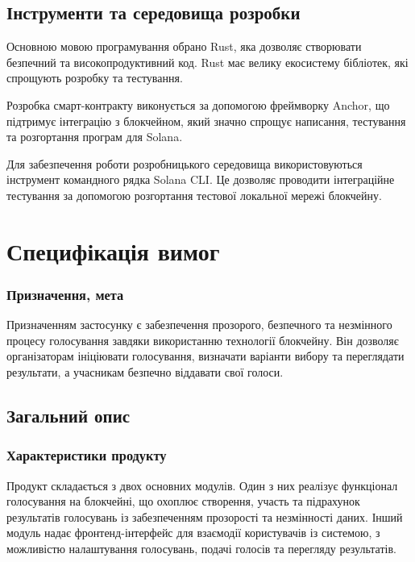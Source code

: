 \documentclass[14pt]{extreport}
\begin{document}
  \subsection{Інструменти та середовища розробки}
  
  
  Основною мовою програмування обрано Rust, яка дозволяє створювати безпечний та високопродуктивний код. Rust має велику екосистему бібліотек, які спрощують розробку та тестування.

  Розробка смарт-контракту виконується за допомогою фреймворку Anchor, що підтримує інтеграцію з блокчейном, який значно спрощує написання, тестування та розгортання програм для Solana.

  Для забезпечення роботи розробницького середовища використовуються інструмент командного рядка Solana CLI. Це дозволяє проводити інтеграційне тестування за допомогою розгортання тестової локальної мережі блокчейну.
  
  \section{Специфікація вимог}
  \subsubsection{Призначення, мета}
  
  Призначенням застосунку є забезпечення прозорого, безпечного та незмінного процесу голосування завдяки використанню технології блокчейну. Він дозволяє організаторам ініціювати голосування, визначати варіанти вибору та переглядати результати, а учасникам безпечно віддавати свої голоси.
  
  
  \subsection{Загальний опис}
  \subsubsection{Характеристики продукту}  
  Продукт складається з двох основних модулів. Один з них реалізує функціонал голосування на блокчейні, що охоплює створення, участь та підрахунок результатів голосувань із забезпеченням прозорості та незмінності даних. Інший модуль надає фронтенд-інтерфейс для взаємодії користувачів із системою, з можливістю налаштування голосувань, подачі голосів та перегляду результатів.
  
\end{document}
